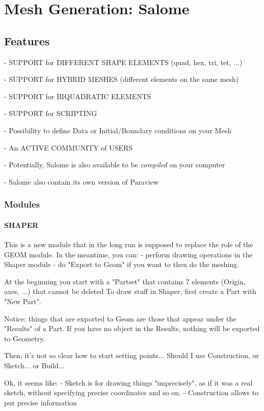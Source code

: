 \documentclass[10pt]{book}
\begin{document}
\part{Mesh Generation: Salome}


\chapter{Features}


 - {SUPPORT for DIFFERENT SHAPE ELEMENTS (quad, hex, tri, tet, ...)} 

 - {SUPPORT for HYBRID MESHES (different elements on the same mesh)}
    
 - {SUPPORT for BIQUADRATIC ELEMENTS}
    
 - {SUPPORT for SCRIPTING}
  
 - Possibility to define Data or Initial/Boundary conditions on your Mesh 

 - {An ACTIVE COMMUNITY of USERS}

 - Potentially, Salome is also available to be \textit{compiled} on your computer
 
 - Salome also contain its own version of Paraview

 
 
 \section{Modules}

 \subsection{SHAPER}


This is a new module that in the long run is supposed to replace the role of the GEOM module.
In the meantime, you can:
  - perform drawing operations in the Shaper module 
  - do "Export to Geom" if you want to then do the meshing.

At the beginning you start with a "Partset" that contains 7 elements (Origin, axes, ...) that cannot be deleted  
To draw stuff in Shaper, first create a Part with "New Part".

Notice: things that are exported to Geom are those that appear under the "Results" of a Part.
If you have no object in the Results, nothing will be exported to Geometry.

Then, it's not so clear how to start setting points... Should I use Construction, or Sketch... or Build...

Ok, it seems like:
 - Sketch is for drawing things "imprecisely", as if it was a real sketch, without specifying precise coordinates and so on.
 - Construction allows to put precise information
\end{document}
